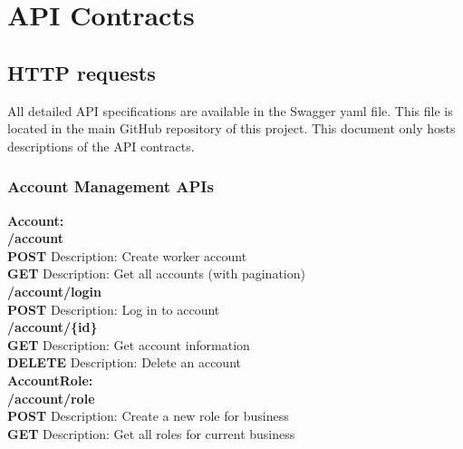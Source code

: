 \documentclass[11pt,a4paper,pdftex]{article}
\begin{document}
\section{API Contracts}

\subsection{HTTP requests}

All detailed API specifications are available in the Swagger yaml file. This file is located in the main GitHub repository of this project. This document only hosts descriptions of the API contracts.

\subsubsection{Account Management APIs}
\textbf{Account:}\\
% 
\hspace*{1em}\textbf{/account}\\
\hspace*{2em}\textbf{POST} Description: Create worker account\\
\hspace*{2em}\textbf{GET} Description: Get all accounts (with pagination)\\

\hspace*{1em}\textbf{/account/login}\\
\hspace*{2em}\textbf{POST} Description: Log in to account\\

\hspace*{1em}\textbf{/account/\{id\}}\\
\hspace*{2em}\textbf{GET} Description: Get account information\\
\hspace*{2em}\textbf{DELETE} Description: Delete an account\\


\textbf{AccountRole:}\\
\hspace*{1em}\textbf{/account/role}\\
\hspace*{2em}\textbf{POST} Description: Create a new role for business\\
\hspace*{2em}\textbf{GET} Description: Get all roles for current business\\
\end{document}
